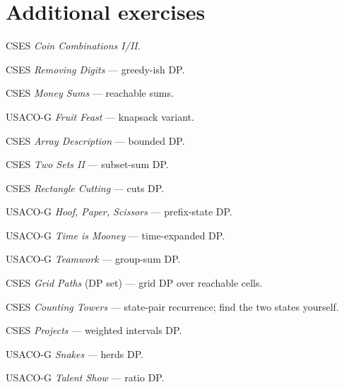 \section{Additional exercises}
\begin{exercise}[easy] CSES \emph{Coin Combinations I/II}. \end{exercise}
\begin{exercise}[easy] CSES \emph{Removing Digits} --- greedy-ish DP. \end{exercise}
\begin{exercise}[easy] CSES \emph{Money Sums} --- reachable sums. \end{exercise}
\begin{exercise}[easy] USACO-G \emph{Fruit Feast} --- knapsack variant. \end{exercise}
\begin{exercise}[medium] CSES \emph{Array Description} --- bounded DP. \end{exercise}
\begin{exercise}[medium] CSES \emph{Two Sets II} --- subset-sum DP. \end{exercise}
\begin{exercise}[medium] CSES \emph{Rectangle Cutting} --- cuts DP. \end{exercise}
\begin{exercise}[medium] USACO-G \emph{Hoof, Paper, Scissors} --- prefix-state DP. \end{exercise}
\begin{exercise}[medium] USACO-G \emph{Time is Mooney} --- time-expanded DP. \end{exercise}
\begin{exercise}[medium] USACO-G \emph{Teamwork} --- group-sum DP. \end{exercise}
\begin{exercise}[medium] CSES \emph{Grid Paths} (DP set) --- grid DP over reachable cells. \end{exercise}
\begin{exercise}[medium] CSES \emph{Counting Towers} --- state-pair recurrence; find the two states yourself. \end{exercise}
\begin{exercise}[hard] CSES \emph{Projects} --- weighted intervals DP. \end{exercise}
\begin{exercise}[hard] USACO-G \emph{Snakes} --- herds DP. \end{exercise}
\begin{exercise}[hard] USACO-G \emph{Talent Show} --- ratio DP. \end{exercise}


